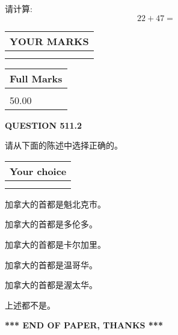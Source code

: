 \documentclass{ctexart}
\begin{document}
  
 
请计算:
\begin{equation}
22 +  %
47 = \nonumber
\end{equation}
 

 

 
  
\vspace{0.2in}
  
\noindent\begin{tabular}{|l|}
\hline
 YOUR MARKS  \\
\hline
 \\ 
 \\ 
\hline
\end{tabular}
\hspace{0.05in} \begin{tabular}{|l|}
\hline
 Full Marks  \\
\hline
 \\ 
50.00 \\
\hline
\end{tabular}
{\textbf{\Large{QUESTION
511.2 
}}}
  
  
请从下面的陈述中选择正确的。
  
  
\noindent\hspace{3.0in} \begin{tabular}{|l|}
\hline
Your choice \\
\hline
 \\ 
 \\ 
\hline
\end{tabular}
  
  
 
 
加拿大的首都是魁北克市。
 
 
加拿大的首都是多伦多。
 
 
加拿大的首都是卡尔加里。
 
 
加拿大的首都是温哥华。
 
 
加拿大的首都是渥太华。
 
 
 上述都不是。
 
 
   
   
 \vspace{0.2in}
 
   
   
   
   
\vspace{1.0in} 
{\textbf{\large{ *** END OF PAPER, THANKS *** }}} 
   
\end{document}
